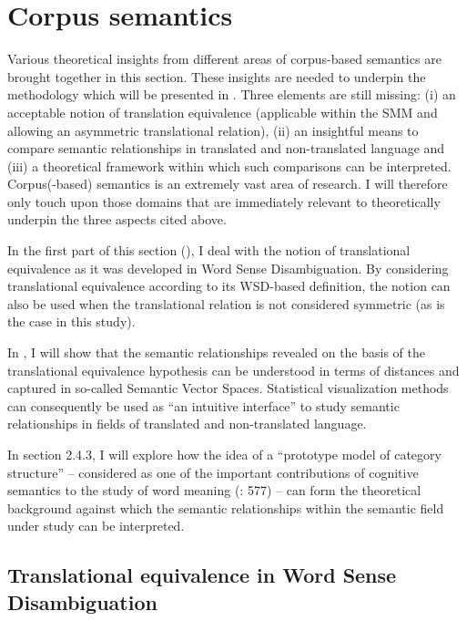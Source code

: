 \section{\label{sec:2.4}  Corpus semantics}

Various theoretical insights from different areas of corpus-based semantics are brought together in this section. These insights are needed to underpin the methodology which will be presented in . Three elements are still missing: (i) an acceptable notion of translation equivalence (applicable within the SMM and allowing an asymmetric translational relation), (ii) an insightful means to compare semantic relationships in translated and non-translated language and (iii) a theoretical framework within which such comparisons can be interpreted. Corpus(-based) semantics is an extremely vast area of research. I will therefore only touch upon those domains that are immediately relevant to theoretically underpin the three aspects cited above.



In the first part of this section (), I deal with the notion of translational equivalence as it was developed in Word Sense Disambiguation. By considering translational equivalence according to its WSD-based definition, the notion can also be used when the translational relation is not considered symmetric (as is the case in this study).



In , I will show that the semantic relationships revealed on the basis of the translational equivalence hypothesis can be understood in terms of distances and captured in so-called Semantic Vector Spaces. Statistical visualization methods can consequently be used as “an intuitive interface” \citep*[17]{heylen_looking_2012} to study semantic relationships in fields of translated and non-translated language.



In section 2.4.3, I will explore how the idea of a “prototype model of category structure” – considered as one of the important contributions of cognitive semantics to the study of word meaning (\citealt{allan_lexical_2013}: 577) – can form the theoretical background against which the semantic relationships within the semantic field under study can be interpreted.


\subsection{\label{sec:2.4.1}  Translational equivalence in Word Sense Disambiguation}

